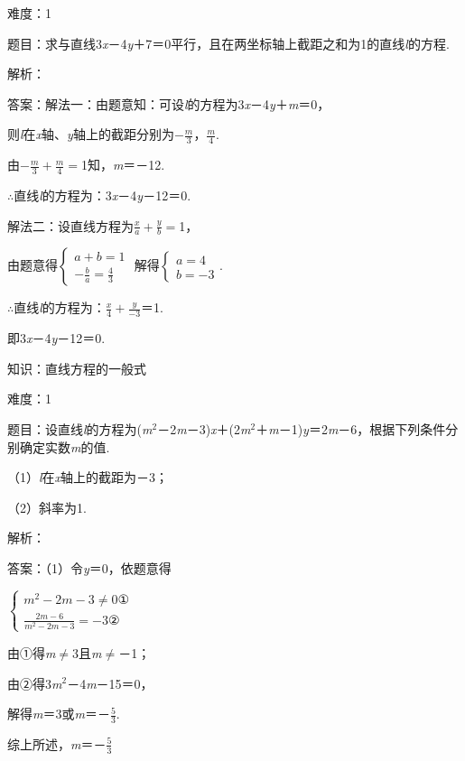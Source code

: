 \documentclass{article} %
\begin{document}
难度：1

题目：求与直线3\textit{x}－4\textit{y}＋7＝0平行，且在两坐标轴上截距之和为1的直线\textit{l}的方程.

解析：

答案：解法一：由题意知：可设\textit{l}的方程为3\textit{x}－4\textit{y}＋\textit{m}＝0，

则\textit{l}在\textit{x}轴、\textit{y}轴上的截距分别为$-\frac{m}{3}$，$\frac{m}{4}$.

由$-\frac{m}{3}+\frac{m}{4}=$1知，\textit{m}＝－12.

$\mathrm{\therefore}$直线\textit{l}的方程为：3\textit{x}－4\textit{y}－12＝0.

解法二：设直线方程为$\frac{x}{a}+\frac{y}{b}=$1，

由题意得$\left\{\begin{array}{l} a+b=1\\ -\frac{b}{a}=\frac{4}{3} \end{array}\right.$ 解得$\left\{\begin{array}{l} a=4\\ b=-3 \end{array}\right.$.

$\mathrm{\therefore}$直线\textit{l}的方程为：$\frac{x}{4}+\frac{y}{-3}$＝1.

即3\textit{x}－4\textit{y}－12＝0.

知识：直线方程的一般式

难度：1

题目：设直线\textit{l}的方程为(\textit{m}${}^{2}$－2\textit{m}－3)\textit{x}＋(2\textit{m}${}^{2}$＋\textit{m}－1)\textit{y}＝2\textit{m}－6，根据下列条件分别确定实数\textit{m}的值.

（1）\textit{l}在\textit{x}轴上的截距为－3；

（2）斜率为1.

解析：

答案：（1）令\textit{y}＝0，依题意得

$\left\{\begin{array}{l} m^2-2m-3\neq 0 \text{①}\\ \frac{2m-6}{m^2-2m-3}=-3\text{②} \end{array}\right.$

由①得\textit{m}$\mathrm{\neq}$3且\textit{m}$\mathrm{\neq}$－1；

由②得3\textit{m}${}^{2}$－4\textit{m}－15＝0，

解得\textit{m}＝3或\textit{m}＝－$\frac{5}{3}$.

综上所述，\textit{m}＝－$\frac{5}{3}$
\end{document}
